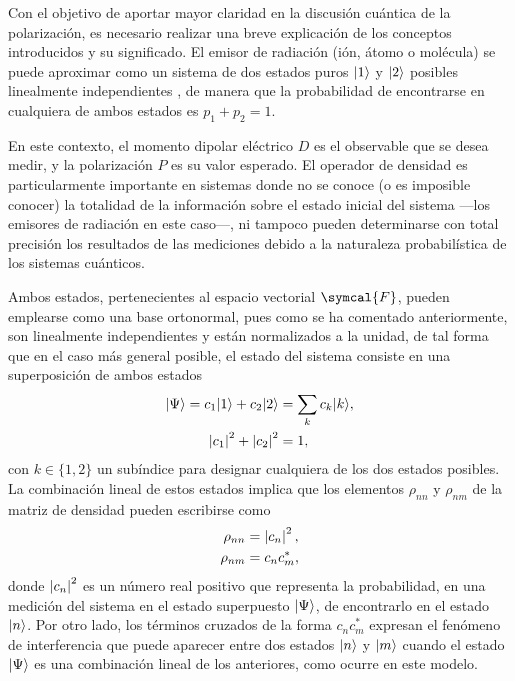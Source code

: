 Con el objetivo de aportar mayor claridad en la discusión cuántica de la polarización, es necesario realizar una breve explicación de los conceptos introducidos y su significado. El emisor de radiación (ión, átomo o molécula) se puede aproximar\autocite{Milonni1988} como un sistema de dos estados puros $|1\rangle$ y $|2\rangle$ posibles linealmente independientes \autocite{Cohen-Tannoudji2019}, de manera que la probabilidad de encontrarse en cualquiera de ambos estados es $p_{1} + p_{2} = 1$.

En este contexto, el momento dipolar eléctrico $D$ es el observable que se desea medir, y la polarización $P$ es su valor esperado. El operador de densidad es particularmente importante en sistemas donde no se conoce (o es imposible conocer) la totalidad de la información sobre el estado inicial del sistema ---los emisores de radiación en este caso---, ni tampoco pueden determinarse con total precisión los resultados de las mediciones debido a la naturaleza probabilística de los sistemas cuánticos. 

Ambos estados, pertenecientes al espacio vectorial $\symcal{F}$, pueden emplearse como una base ortonormal, pues como se ha comentado anteriormente, son linealmente independientes y están normalizados a la unidad, de tal forma que en el caso más general posible, el estado del sistema consiste en una superposición de ambos estados
\begin{align}
  |\Psi\rangle = c_{1}|1\rangle + c_{2}|2\rangle &= \sum_{k} c_{k}|k\rangle, \\
  \left|c_{1}\right|^{2} + \left|c_{2}\right|^{2} &= 1,
\end{align}
con $k \in \{1,2\}$ un subíndice para designar cualquiera de los dos estados posibles. La combinación lineal de estos estados implica que los elementos $\rho_{nn}$ y $\rho_{nm}$ de la matriz de densidad pueden escribirse como
\begin{align}
    \label{eq:3.10a}
    \rho_{nn} &= \left|c_{n}\right|^{2}, \\
    \label{eq:3.10b}
    \rho_{nm} &= c_{n}c^{*}_{m},
\end{align}
donde $\left|c_{n}\right|^{2}$ es un número real positivo que representa la probabilidad, en una medición del sistema en el estado superpuesto $|\Psi\rangle$, de encontrarlo en el estado $|n\rangle$. Por otro lado, los términos cruzados de la forma $c_{n}c^{*}_{m}$ expresan el fenómeno de interferencia que puede aparecer entre dos estados $|n\rangle$ y $|m\rangle$ cuando el estado $|\Psi\rangle$ es una combinación lineal de los anteriores, como ocurre en este modelo. 

